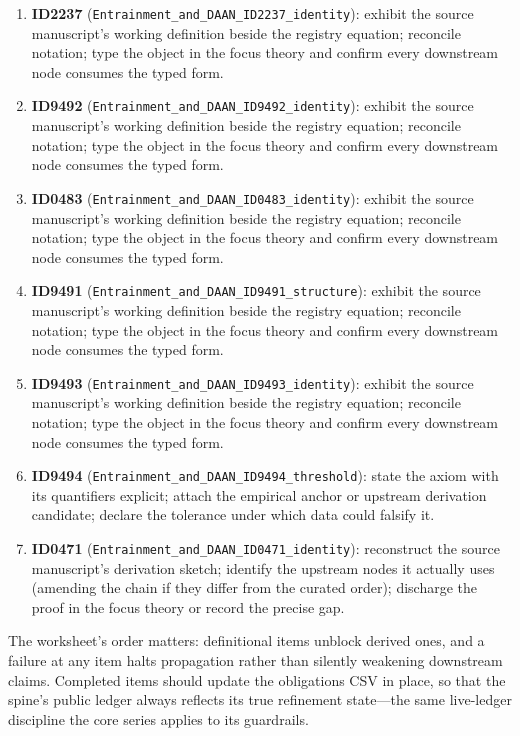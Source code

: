 \documentclass[11pt]{article}
\theoremstyle{remark}
\begin{document}
\begin{enumerate}
\item \textbf{ID2237} (\texttt{Entrainment\_and\_DAAN\_ID2237\_identity}): exhibit the source manuscript's working definition beside the registry equation; reconcile notation; type the object in the focus theory and confirm every downstream node consumes the typed form.
\item \textbf{ID9492} (\texttt{Entrainment\_and\_DAAN\_ID9492\_identity}): exhibit the source manuscript's working definition beside the registry equation; reconcile notation; type the object in the focus theory and confirm every downstream node consumes the typed form.
\item \textbf{ID0483} (\texttt{Entrainment\_and\_DAAN\_ID0483\_identity}): exhibit the source manuscript's working definition beside the registry equation; reconcile notation; type the object in the focus theory and confirm every downstream node consumes the typed form.
\item \textbf{ID9491} (\texttt{Entrainment\_and\_DAAN\_ID9491\_structure}): exhibit the source manuscript's working definition beside the registry equation; reconcile notation; type the object in the focus theory and confirm every downstream node consumes the typed form.
\item \textbf{ID9493} (\texttt{Entrainment\_and\_DAAN\_ID9493\_identity}): exhibit the source manuscript's working definition beside the registry equation; reconcile notation; type the object in the focus theory and confirm every downstream node consumes the typed form.
\item \textbf{ID9494} (\texttt{Entrainment\_and\_DAAN\_ID9494\_threshold}): state the axiom with its quantifiers explicit; attach the empirical anchor or upstream derivation candidate; declare the tolerance under which data could falsify it.
\item \textbf{ID0471} (\texttt{Entrainment\_and\_DAAN\_ID0471\_identity}): reconstruct the source manuscript's derivation sketch; identify the upstream nodes it actually uses (amending the chain if they differ from the curated order); discharge the proof in the focus theory or record the precise gap.
\end{enumerate}

The worksheet's order matters: definitional items unblock derived ones, and a failure at any item halts propagation rather than silently weakening downstream claims. Completed items should update the obligations CSV in place, so that the spine's public ledger always reflects its true refinement state---the same live-ledger discipline the core series applies to its guardrails.
\end{document}
